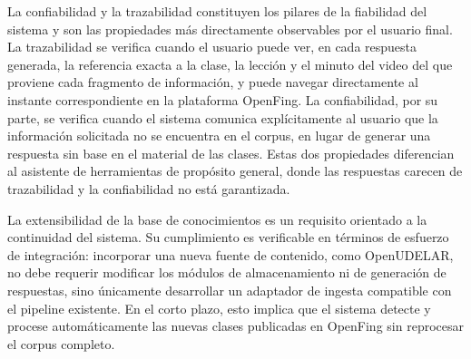 La confiabilidad y la trazabilidad constituyen los pilares de la fiabilidad del sistema y son las propiedades más directamente observables por el usuario final. La trazabilidad se verifica cuando el usuario puede ver, en cada respuesta generada, la referencia exacta a la clase, la lección y el minuto del video del que proviene cada fragmento de información, y puede navegar directamente al instante correspondiente en la plataforma OpenFing. La confiabilidad, por su parte, se verifica cuando el sistema comunica explícitamente al usuario que la información solicitada no se encuentra en el corpus, en lugar de generar una respuesta sin base en el material de las clases. Estas dos propiedades diferencian al asistente de herramientas de propósito general, donde las respuestas carecen de trazabilidad y la confiabilidad no está garantizada.

La extensibilidad de la base de conocimientos es un requisito orientado a la continuidad del sistema. Su cumplimiento es verificable en términos de esfuerzo de integración: incorporar una nueva fuente de contenido, como OpenUDELAR, no debe requerir modificar los módulos de almacenamiento ni de generación de respuestas, sino únicamente desarrollar un adaptador de ingesta compatible con el pipeline existente. En el corto plazo, esto implica que el sistema detecte y procese automáticamente las nuevas clases publicadas en OpenFing sin reprocesar el corpus completo.
